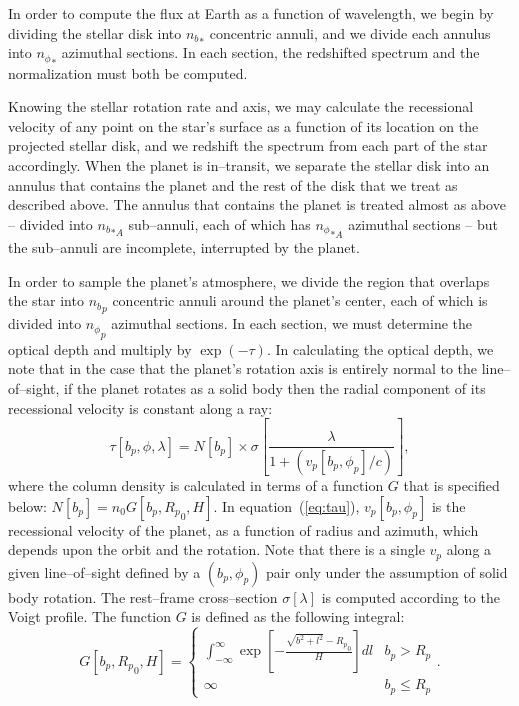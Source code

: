\documentclass[12pt,preprint]{aastex}
\begin{document}
In order to compute the flux at Earth as a function of wavelength, we
begin by dividing the stellar disk into ${n_b}_*$ concentric annuli,
and we divide each annulus into ${n_\phi}_*$ azimuthal sections.  In
each section, the redshifted spectrum and the normalization must
both be computed.

Knowing the stellar rotation rate and axis, we may calculate the recessional
velocity of any point on the star's surface as a function of its location on
the projected stellar disk, and we redshift the spectrum from each part
of the star accordingly.
When the planet is in--transit, we separate the stellar disk into an annulus
that contains the planet and the rest of the disk that we treat as described
above.  The annulus that contains the planet is treated almost as above --
divided into ${n_b}_{*A}$ sub--annuli, each of which has ${n_\phi}_{*A}$
azimuthal sections -- but the sub--annuli are incomplete, interrupted by
the planet.

In order to sample the planet's atmosphere, we divide the region that overlaps
the star into ${n_b}_p$ concentric annuli around the planet's center,
each of which is divided into ${n_\phi}_p$ azimuthal sections.  In each
section, we must determine the optical depth and multiply by
$\exp{\left(-\tau\right)}$.  In calculating the optical depth, we note
that in the case that the planet's rotation axis is entirely normal to the
line--of--sight, if the planet rotates as a solid body then the radial
component of its recessional velocity is constant along a ray:
\begin{equation}
\tau[b_p, \phi, \lambda] = N[b_p] \times \sigma\left[\frac{\lambda}{1 + (v_p[b_p, \phi_p] /c)}\right],
\label{eq:tau}
\end{equation}
where the column density is calculated in terms of a function $G$ that
is specified below: $N[b_p] = n_0 G[b_p, {R_p}_0, H]$.  In
equation~(\ref{eq:tau}), $v_p[b_p, \phi_p]$ is the recessional velocity of
the planet, as a function of radius and azimuth, which depends upon
the orbit and the rotation.  Note that there is a single $v_p$ along a given
line--of--sight defined by a $(b_p,\phi_p)$ pair only under the assumption of
solid body rotation.  The rest--frame cross--section $\sigma[\lambda]$ is
computed according to the Voigt profile.  The function $G$ is defined as
the following
integral:
\begin{equation}
G[b_p, {R_p}_0, H] = \left\{ \begin{array}{ll}
\int_{-\infty}^{\infty} \exp\left[-\frac{\sqrt{b^2 + l^2} - {R_p}_0}{H}\right] d l & b_p > R_p \\
\infty & b_p \leq R_p
\end{array} \right. .
\label{eq:funcG}
\end{equation}
\end{document}
